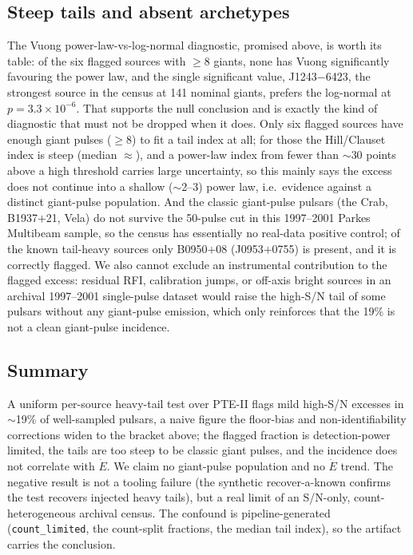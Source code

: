 \documentclass[twocolumn]{aastex631}
\newcommand{\code}[1]{\texttt{#1}}
\begin{document}
\subsection{Steep tails and absent archetypes}
The Vuong power-law-vs-log-normal diagnostic,
promised above, is worth its table: of the six flagged sources with $\ge 8$ giants, none has
Vuong significantly favouring the power law, and the single significant value,
J1243$-$6423, the strongest source in the census at 141 nominal giants, prefers the
log-normal at $p = 3.3\times10^{-6}$. That supports the null conclusion and is exactly the
kind of diagnostic that must not be dropped when it does. Only six flagged sources have enough giant
pulses ($\ge 8$) to fit a tail index at all; for those the Hill/Clauset index is steep (median
$\approx$\ptRealMedGamma), and a power-law index from fewer than $\sim$30 points above a high
threshold carries large uncertainty, so this mainly says the excess does not continue into a
shallow ($\sim$2--3) power law, i.e.\ evidence against a distinct giant-pulse population. And the
classic giant-pulse pulsars (the Crab, B1937$+$21, Vela) do not survive the 50-pulse cut in this
1997--2001 Parkes Multibeam sample, so the census has essentially no real-data positive control; of
the known tail-heavy sources only B0950$+$08 (J0953$+$0755) is present, and it is correctly flagged.
We also cannot exclude an instrumental contribution to the flagged excess: residual RFI,
calibration jumps, or off-axis bright sources in an archival 1997--2001 single-pulse dataset would
raise the high-S/N tail of some pulsars without any giant-pulse emission, which only reinforces
that the 19\% is not a clean giant-pulse incidence.

\subsection{Summary}
A uniform per-source heavy-tail test over PTE-II flags mild high-S/N
excesses in $\sim$19\% of well-sampled pulsars, a naive figure the floor-bias and
non-identifiability corrections widen to the bracket above; the flagged fraction is
detection-power limited,
the tails are too steep to be classic giant pulses, and the incidence does not correlate with $\dot
E$. We claim no giant-pulse population and no $\dot E$ trend. The negative result is not a tooling
failure (the synthetic recover-a-known confirms the test recovers injected heavy tails), but a
real limit of an S/N-only, count-heterogeneous archival census. The confound is pipeline-generated
(\code{count\_limited}, the count-split fractions, the median tail index), so the artifact carries the
conclusion.
\end{document}
